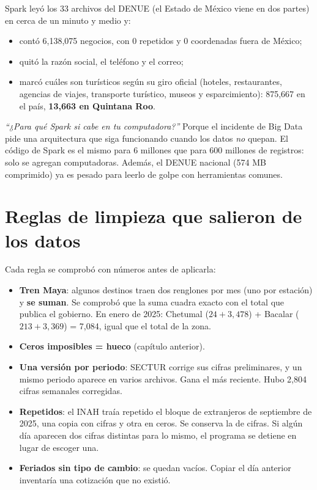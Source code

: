 \begin{ejemplo}
Spark leyó los 33 archivos del DENUE (el Estado de México viene en dos partes) en cerca de un minuto y medio y:
\begin{itemize}
\item contó 6,138,075 negocios, con 0 repetidos y 0 coordenadas fuera de México;
\item quitó la razón social, el teléfono y el correo;
\item marcó cuáles son turísticos según su giro oficial (hoteles, restaurantes, agencias de viajes, transporte
  turístico, museos y esparcimiento): 875,667 en el país, \textbf{13,663 en Quintana Roo}.
\end{itemize}
\end{ejemplo}

\begin{teprofe}
\emph{``¿Para qué Spark si cabe en tu computadora?''} Porque el incidente de Big Data pide una arquitectura que siga
funcionando cuando los datos \emph{no} quepan. El código de Spark es el mismo para 6 millones que para 600 millones de
registros: solo se agregan computadoras. Además, el DENUE nacional (574 MB comprimido) ya es pesado para leerlo de golpe con
herramientas comunes.
\end{teprofe}

\section{Reglas de limpieza que salieron de los datos}
Cada regla se comprobó con números antes de aplicarla:
\begin{itemize}
\item \textbf{Tren Maya}: algunos destinos traen dos renglones por mes (uno por estación) y \textbf{se suman}. Se comprobó
  que la suma cuadra exacto con el total que publica el gobierno. En enero de 2025: Chetumal ($24+3{,}478$) + Bacalar
  ($213+3{,}369$) = 7,084, igual que el total de la zona.
\item \textbf{Ceros imposibles = hueco} (capítulo anterior).
\item \textbf{Una versión por periodo}: SECTUR corrige sus cifras preliminares, y un mismo periodo aparece en varios
  archivos. Gana el más reciente. Hubo 2,804 cifras semanales corregidas.
\item \textbf{Repetidos}: el INAH traía repetido el bloque de extranjeros de septiembre de 2025, una copia con cifras y
  otra en ceros. Se conserva la de cifras. Si algún día aparecen dos cifras distintas para lo mismo, el programa se
  detiene en lugar de escoger una.
\item \textbf{Feriados sin tipo de cambio}: se quedan vacíos. Copiar el día anterior inventaría una cotización que no
  existió.
\end{itemize}

